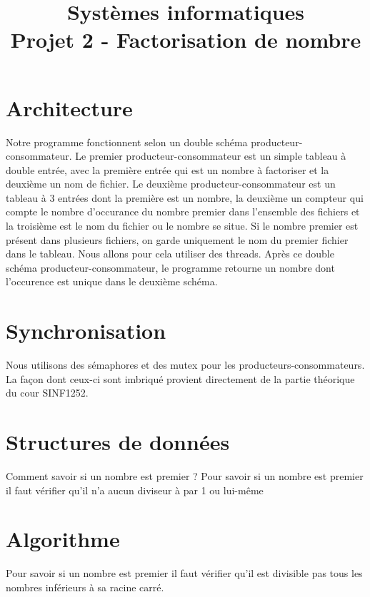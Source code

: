 \documentclass[11pt,a4paper]{article}
\title{Systèmes informatiques\\
Projet 2 - Factorisation de nombre}
\date{\vspace{-5ex}}
\begin{document}
\maketitle


\section{Architecture}
Notre programme fonctionnent selon un double schéma producteur-consommateur. Le premier producteur-consommateur est un simple tableau à double entrée, avec la première entrée qui est un nombre à factoriser et la deuxième un nom de fichier. Le deuxième producteur-consommateur est un tableau à 3 entrées dont la première est un nombre, la deuxième un compteur qui compte le nombre d'occurance du nombre premier dans l'ensemble des fichiers et la troisième est le nom du fichier ou le nombre se situe. Si le nombre premier est présent dans plusieurs fichiers, on garde uniquement le nom du premier fichier dans le tableau. Nous allons pour cela utiliser des threads. Après ce double schéma producteur-consommateur, le programme retourne un nombre dont l'occurence est unique dans le deuxième schéma.

\section{Synchronisation}
Nous utilisons des sémaphores et des mutex pour les producteurs-consommateurs. La façon dont ceux-ci sont imbriqué provient directement de la partie théorique du cour SINF1252.

\section{Structures de données}
Comment savoir si un nombre est premier ?
Pour savoir si un nombre est premier il faut vérifier qu'il n'a aucun diviseur à par 1 ou lui-même

\section{Algorithme}

Pour savoir si un nombre est premier il faut vérifier qu'il est divisible pas tous les nombres inférieurs à sa racine carré. 
\end{document}
